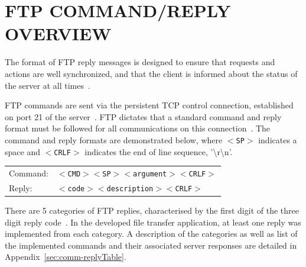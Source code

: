 \documentclass[10pt,twocolumn]{witseiepaper}
\begin{document}
\section{FTP COMMAND/REPLY OVERVIEW}\label{sec:command/reply}

The format of FTP reply messages is designed to ensure that requests and actions are well synchronized, and that the client is informed about the status of the server at all times~\cite{rfc959}. 

FTP commands are sent via the persistent TCP control connection, established on port 21 of the server~\cite{topDownApproach6th}. FTP dictates that a standard command and reply format must be followed for all communications on this connection~\cite{rfc959}. The command and reply formats are demonstrated below, where \texttt{$<$SP$>$} indicates a space and \texttt{$<$CRLF$>$} indicates the end of line sequence, '\textbackslash r\textbackslash n'.

\begin{tabular}{ll}
	Command:& \texttt{$<$CMD$>$$<$SP$>$$<$argument$>$$<$CRLF$>$} \\[5pt]
	Reply:& \texttt{$<$code$>$$<$description$>$$<$CRLF$>$} \\[5pt]
\end{tabular} 

There are 5 categories of FTP replies, characterised by the first digit of the three digit reply code~\cite{rfc959}. In the developed file transfer application, at least one reply was implemented from each category. A description of the categories as well as list of the implemented commands and their associated server responses are detailed in Appendix~\ref{sec:comm-replyTable}.

%
%
%
%



\end{document}
